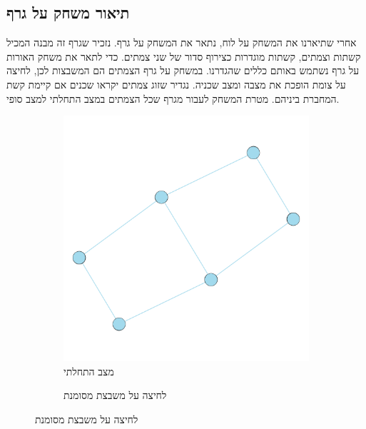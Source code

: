 \documentclass[12pt,leqno]{article}
\theoremstyle{theoremdd}
\begin{document}
\subsection{תיאור משחק על גרף}
אחרי שתיארנו את המשחק על לוח, נתאר את המשחק על גרף.
נזכיר שגרף זה מבנה המכיל קשתות וצמתים, קשתות מוגדרות כצירוף סדור של שני צמתים.
כדי לתאר את משחק האורות על גרף נשתמש באותם כללים שהגדרנו.
במשחק על גרף הצמתים הם המשבצות
לכן, לחיצה על צומת הופכת את מצבה ומצב שכניה.
נגדיר שזוג צמתים יקראו שכנים אם קיימת
קשת המחברת ביניהם.
מטרת המשחק לעבור מגרף שכל הצמתים במצב התחלתי למצב סופי.

\begin{figure}[ht]
    \caption{משחק על גרף לדוגמה}
    \label{fig: start game in graph}
    \begin{subfigure}{.5\textwidth}
        \centering
        \caption{מצב התחלתי}
        \label{subfig: graph game start}
        \includegraphics[scale=0.7]{images/graph_start_board.png}
    \end{subfigure}%
    \begin{subfigure}{.5\textwidth}
        \centering
        \caption{לחיצה על משבצת מסומנת}
        \label{subfig: graph game move}

\end{subfigure}
\end{figure}
\end{document}
